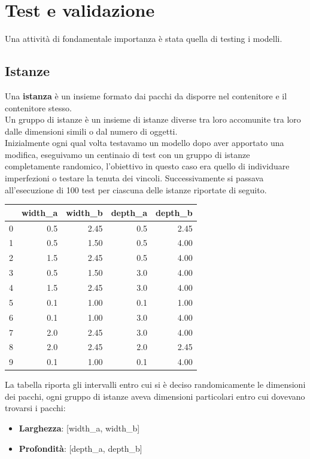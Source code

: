 
\hypertarget{(chap:capitolo5)}{}
\chapter{Test e validazione}
Una attività di fondamentale importanza è stata quella di testing i modelli.
\section{Istanze}
Una \textbf{istanza} è un insieme formato dai pacchi da disporre nel contenitore e il contenitore stesso.\\
Un gruppo di istanze è un insieme di istanze diverse tra loro accomunite tra loro dalle dimensioni simili o dal numero di oggetti.\\
Inizialmente ogni qual volta testavamo un modello dopo aver apportato una modifica, eseguivamo un centinaio di test con un gruppo di istanze completamente randomico, l'obiettivo in questo caso era quello di individuare imperfezioni o testare la tenuta dei vincoli.
Successivamente si passava all'esecuzione di 100 test per ciascuna delle istanze riportate di seguito.
\begin{center}
	\begin{tabular}{lrrrr}
		\toprule
		{} & width\_a & width\_b & depth\_a & depth\_b \\
		\midrule
		0  & 0.5      & 2.45     & 0.5      & 2.45     \\
		1  & 0.5      & 1.50     & 0.5      & 4.00     \\
		2  & 1.5      & 2.45     & 0.5      & 4.00     \\
		3  & 0.5      & 1.50     & 3.0      & 4.00     \\
		4  & 1.5      & 2.45     & 3.0      & 4.00     \\
		5  & 0.1      & 1.00     & 0.1      & 1.00     \\
		6  & 0.1      & 1.00     & 3.0      & 4.00     \\
		7  & 2.0      & 2.45     & 3.0      & 4.00     \\
		8  & 2.0      & 2.45     & 2.0      & 2.45     \\
		9  & 0.1      & 1.00     & 0.1      & 4.00     \\
		\bottomrule
	\end{tabular}
\end{center}
La tabella riporta gli intervalli entro cui si è deciso randomicamente le dimensioni dei pacchi, ogni gruppo di istanze aveva dimensioni particolari entro cui dovevano trovarsi i pacchi:
\begin{itemize}
	\item \textbf{Larghezza}: [width\_a, width\_b]
	\item \textbf{Profondità}: [depth\_a, depth\_b]
\end{itemize}
